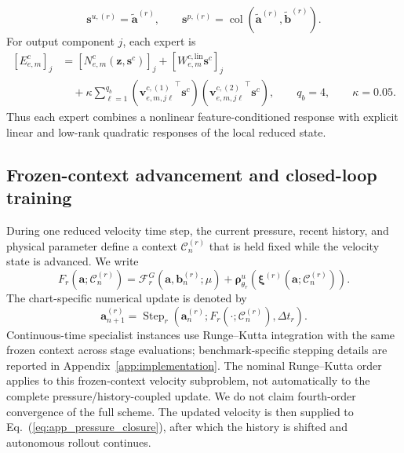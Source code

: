\documentclass{article}
\def\plaineqref#1{\ref{#1}}
\begin{document}
\begin{equation}
  \bm s^{u,(r)}
  =
  \widetilde{\bm a}^{(r)},
  \qquad
  \bm s^{p,(r)}
  =
  \operatorname{col}
  \left(
    \widetilde{\bm a}^{(r)},
    \widetilde{\bm b}^{(r)}
  \right).
  \label{eq:app_expert_state_slices}
\end{equation}
For output component $j$, each expert is
\begin{align}
  \left[E_{e,m}^c\right]_j
  &=
  \left[
    N_{e,m}^c
    \left(
      \bm z,\bm s^c
    \right)
  \right]_j
  +
  \left[
    W_{e,m}^{c,\mathrm{lin}}
    \bm s^c
  \right]_j
  \nonumber\\
  &\quad+
  \kappa
  \sum_{\ell=1}^{q_b}
  \left(
    {\bm v_{e,m,j\ell}^{c,(1)}}^{\top}
    \bm s^c
  \right)
  \left(
    {\bm v_{e,m,j\ell}^{c,(2)}}^{\top}
    \bm s^c
  \right),
  \qquad
  q_b=4,
  \qquad
  \kappa=0.05.
  \label{eq:app_structured_expert}
\end{align}
Thus each expert combines a nonlinear feature-conditioned response with
explicit linear and low-rank quadratic responses of the local reduced state.


\subsection{Frozen-context advancement and closed-loop training}

During one reduced velocity time step, the current pressure, recent history, and
physical parameter define a context $\mathcal C_n^{(r)}$ that is held fixed
while the velocity state is advanced. We write
\begin{equation}
  F_r
  \left(
    \bm a;\mathcal C_n^{(r)}
  \right)
  =
  \mathcal F_r^G
  \left(
    \bm a,\bm b_n^{(r)};\mu
  \right)
  +
  \bm\rho^u_{\theta_r}
  \left(
    \bm\xi^{(r)}
    \left(
      \bm a;\mathcal C_n^{(r)}
    \right)
  \right).
  \label{eq:app_frozen_context_rhs}
\end{equation}
The chart-specific numerical update is denoted by
\begin{equation}
  \bm a_{n+1}^{(r)}
  =
  \operatorname{Step}_r
  \left(
    \bm a_n^{(r)};
    F_r(\cdot;\mathcal C_n^{(r)}),
    \Delta t_r
  \right).
  \label{eq:app_specialist_step}
\end{equation}
Continuous-time specialist instances use Runge--Kutta integration with the
same frozen context across stage evaluations; benchmark-specific stepping
details are reported in Appendix~\ref{app:implementation}.
The nominal Runge--Kutta order applies to this frozen-context velocity subproblem, not automatically to the complete pressure/history-coupled update. We do not claim fourth-order convergence of the full scheme.
The updated velocity is then supplied to
Eq.~(\plaineqref{eq:app_pressure_closure}), after which the history is
shifted and autonomous rollout continues.
\end{document}
